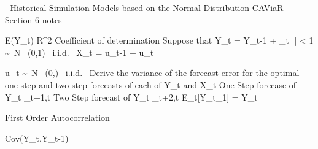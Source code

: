 

Historical Simulation
Models based on the Normal Distribution
CAViaR
Section 6 notes


E(Y_t)
R^2
Coefficient of determination
Suppose that Y_t = \phi Y_{t-1} + \varepsilon_t  |\phi| < 1
\varepsilon \sim \mbox{ N } (0,1) \mbox{ i.i.d. }
X_t = \theta u_{t-1} + u_{t}

u_t \sim \mbox{ N } (0,\sigma) \mbox{ i.i.d. }
Derive the variance of the forecast error for the optimal one-step and two-step forecasts of each of Y_t and X_t
One Step forecase of Y_t
_{t+1,t}
Two Step forecast of Y_t
_{t+2,t}
E_{t}[Y_{t_1}] = \phi Y_t

First Order Autocorrelation

Cov(Y_t,Y_{t-1}) =
